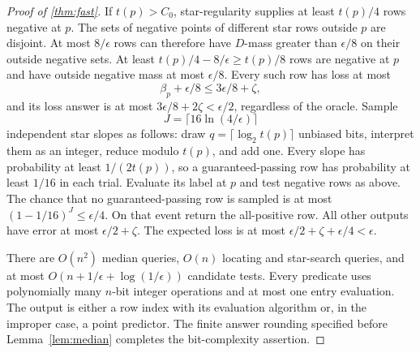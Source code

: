 \begin{proof}[Proof of \cref{thm:fast}]
If $t(p)>C_0$, star-regularity supplies at least $t(p)/4$ rows negative at $p$. The sets of negative points of different star rows outside $p$ are disjoint. At most $8/\epsilon$ rows can therefore have $D$-mass greater than $\epsilon/8$ on their outside negative sets. At least $t(p)/4-8/\epsilon\ge t(p)/8$ rows are negative at $p$ and have outside negative mass at most $\epsilon/8$. Every such row has loss at most
\[
 \beta_p+\epsilon/8\le3\epsilon/8+\zeta,
\]
and its loss answer is at most $3\epsilon/8+2\zeta<\epsilon/2$, regardless of the oracle. Sample
\[
 J=\lceil16\ln(4/\epsilon)\rceil
\]
independent star slopes as follows: draw $q=\lceil\log_2t(p)\rceil$ unbiased bits, interpret them as an integer, reduce modulo $t(p)$, and add one. Every slope has probability at least $1/(2t(p))$, so a guaranteed-passing row has probability at least $1/16$ in each trial. Evaluate its label at $p$ and test negative rows as above. The chance that no guaranteed-passing row is sampled is at most $(1-1/16)^J\le\epsilon/4$. On that event return the all-positive row. All other outputs have error at most $\epsilon/2+\zeta$. The expected loss is at most $\epsilon/2+\zeta+\epsilon/4<\epsilon$.

There are $O(n^2)$ median queries, $O(n)$ locating and star-search queries, and at most $O(n+1/\epsilon+\log(1/\epsilon))$ candidate tests. Every predicate uses polynomially many $n$-bit integer operations and at most one entry evaluation. The output is either a row index with its evaluation algorithm or, in the improper case, a point predictor. The finite answer rounding specified before Lemma~\ref{lem:median} completes the bit-complexity assertion.
\end{proof}
